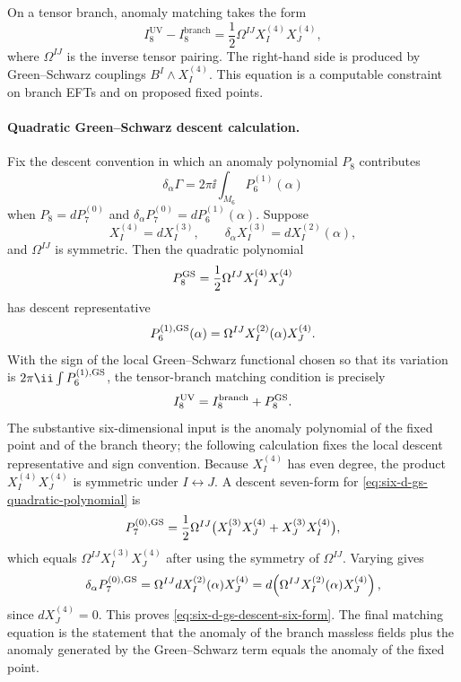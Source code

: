 On a tensor branch, anomaly matching takes the form
\begin{equation}
  I_8^{\mathrm{UV}}-I_8^{\mathrm{branch}}
  =
  \frac12\Omega^{IJ}X_I^{(4)}X_J^{(4)} ,
  \label{eq:six-d-gs-anomaly-matching}
\end{equation}
where \(\Omega^{IJ}\) is the inverse tensor pairing.  The right-hand side is
produced by Green--Schwarz couplings \(B^I\wedge X_I^{(4)}\).  This equation
is a computable constraint on branch EFTs and on proposed fixed points.

\paragraph{Quadratic Green--Schwarz descent calculation.}
Fix the descent convention in which an anomaly polynomial \(P_8\) contributes
\[
  \delta_\alpha \Gamma = 2\pi\ii\int_{M_6}P_6^{(1)}(\alpha)
\]
when \(P_8=dP_7^{(0)}\) and
\(\delta_\alpha P_7^{(0)}=dP_6^{(1)}(\alpha)\).  Suppose
\[
  X_I^{(4)}=dX_I^{(3)},\qquad
  \delta_\alpha X_I^{(3)}=dX_I^{(2)}(\alpha),
\]
and \(\Omega^{IJ}\) is symmetric.  Then the quadratic polynomial
\begin{equation}
  P_8^{\rm GS}
  =
  \frac12\Omega^{IJ}X_I^{(4)}X_J^{(4)}
  \label{eq:six-d-gs-quadratic-polynomial}
\end{equation}
has descent representative
\begin{equation}
  P_6^{(1),{\rm GS}}(\alpha)
  =
  \Omega^{IJ}X_I^{(2)}(\alpha)X_J^{(4)} .
  \label{eq:six-d-gs-descent-six-form}
\end{equation}
With the sign of the local Green--Schwarz functional chosen so that its
variation is \(2\pi\ii\int P_6^{(1),{\rm GS}}\), the tensor-branch matching
condition is precisely
\[
  I_8^{\rm UV}=I_8^{\rm branch}+P_8^{\rm GS}.
\]
The substantive six-dimensional input is the anomaly polynomial of the fixed
point and of the branch theory; the following calculation fixes the local
descent representative and sign convention.  Because \(X_I^{(4)}\) has even
degree, the product
\(X_I^{(4)}X_J^{(4)}\) is symmetric under \(I\leftrightarrow J\).  A descent
seven-form for \eqref{eq:six-d-gs-quadratic-polynomial} is
\[
  P_7^{(0),{\rm GS}}
  =
  \frac12\Omega^{IJ}
  \bigl(
    X_I^{(3)}X_J^{(4)}
    +
    X_J^{(3)}X_I^{(4)}
  \bigr),
\]
which equals \(\Omega^{IJ}X_I^{(3)}X_J^{(4)}\) after using the symmetry of
\(\Omega^{IJ}\).  Varying gives
\[
  \delta_\alpha P_7^{(0),{\rm GS}}
  =
  \Omega^{IJ}dX_I^{(2)}(\alpha)X_J^{(4)}
  =
  d\!\left(\Omega^{IJ}X_I^{(2)}(\alpha)X_J^{(4)}\right),
\]
since \(dX_J^{(4)}=0\).  This proves
\eqref{eq:six-d-gs-descent-six-form}.  The final matching equation is the
statement that the anomaly of the branch massless fields plus the anomaly
generated by the Green--Schwarz term equals the anomaly of the fixed point.

